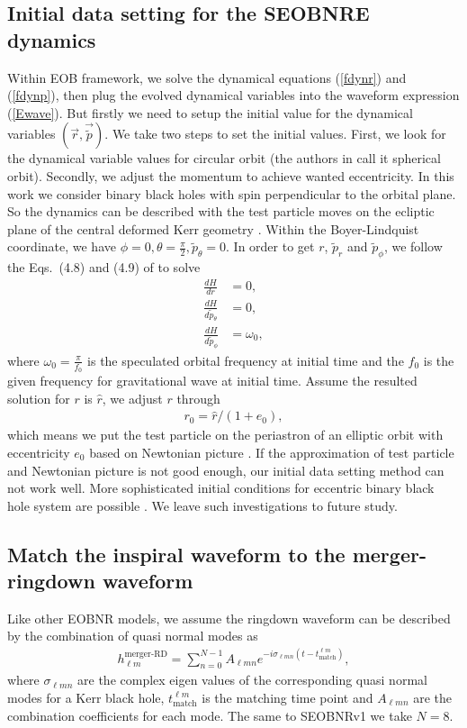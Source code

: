 \documentclass[prd,aps,a4paper,superscriptaddress,twocolumn,footinbib,showpacs]{revtex4}
\begin{document}
\subsection{Initial data setting for the SEOBNRE dynamics}
Within EOB framework, we solve the dynamical equations (\ref{fdynr}) and (\ref{fdynp}), then plug the evolved dynamical variables into the waveform expression (\ref{Ewave}). But firstly we need to setup the initial value for the dynamical variables $(\vec{r},\vec{\tilde{p}})$. We take two steps to set the initial values. First, we look for the dynamical variable values for circular orbit (the authors in \cite{PhysRevD.74.104005} call it spherical orbit). Secondly, we adjust the momentum to achieve wanted eccentricity. In this work we consider binary black holes with spin perpendicular to the orbital plane. So the dynamics can be described with the test particle moves on the ecliptic plane of the central deformed Kerr geometry \cite{PhysRevD.84.124052}. Within the Boyer-Lindquist coordinate, we have $\phi=0,\theta=\frac{\pi}{2},\tilde{p}_\theta=0$. In order to get $r$, $\tilde{p}_r$ and $\tilde{p}_\phi$, we follow the Eqs.~(4.8) and (4.9) of \cite{PhysRevD.74.104005} to solve
\begin{align}
\frac{dH}{dr}&=0,\\
\frac{dH}{d\tilde{p}_\theta}&=0,\\
\frac{dH}{d\tilde{p}_\phi}&=\omega_0,
\end{align}
where $\omega_0=\frac{\pi}{f_0}$ is the speculated orbital frequency at initial time and the $f_0$ is the given frequency for gravitational wave at initial time. Assume the resulted solution for $r$ is $\hat{r}$, we adjust $r$ through
\begin{align}
r_0=\hat{r}/(1+e_0),
\end{align}
which means we put the test particle on the periastron of an elliptic orbit with eccentricity $e_0$ based on Newtonian picture \cite{han2014gravitational}. If the approximation of test particle and Newtonian picture is not good enough, our initial data setting method can not work well. More sophisticated initial conditions for eccentric binary black hole system are possible \cite{PhysRevD.89.084006}. We leave such investigations to future study.

\subsection{Match the inspiral waveform to the merger-ringdown waveform}
Like other EOBNR models, we assume the ringdown waveform can be described by the combination of quasi normal modes as
\begin{align}
h^{\text{merger-RD}}_{\ell m}=\sum_{n=0}^{N-1}A_{\ell mn}e^{-i\sigma_{\ell m n}(t-t^{\ell m}_{\text{match}})},\label{RDwaveform}
\end{align}
where $\sigma_{\ell m n}$ are the complex eigen values of the corresponding quasi normal modes for a Kerr black hole, $t^{\ell m}_{\text{match}}$ is the matching time point and $A_{\ell mn}$ are the combination coefficients for each mode. The same to SEOBNRv1 \cite{SEOBNRv1code} we take $N=8$.
\end{document}
